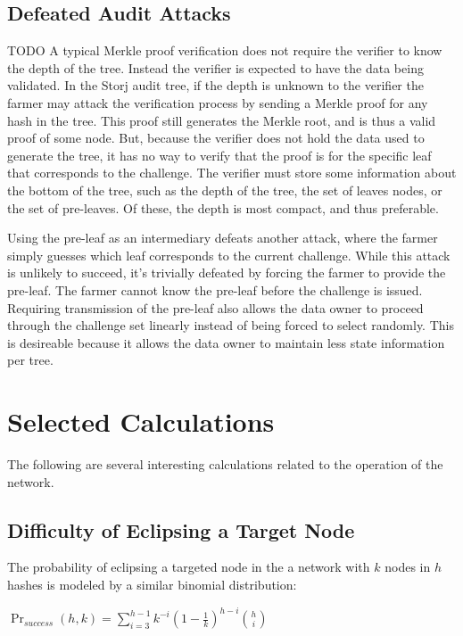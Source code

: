 \documentclass[a4paper,10pt]{article} \usepackage[utf8]{inputenc}
\newcommand{\todo}[1]{{\color{red} TODO #1 }}
\begin{document}
\subsection{Defeated Audit Attacks}

\todo{ A typical Merkle proof verification does not require the verifier to know
the depth of the tree. Instead the verifier is expected to have the data being
validated. In the Storj audit tree, if the depth is unknown to the verifier the
farmer may attack the verification process by sending a Merkle proof for any
hash in the tree. This proof still generates the Merkle root, and is thus a
valid proof of some node. But, because the verifier does not hold the data used
to generate the tree, it has no way to verify that the proof is for the specific
leaf that corresponds to the challenge. The verifier must store some information
about the bottom of the tree, such as the depth of the tree, the set of leaves
nodes, or the set of pre-leaves. Of these, the depth is most compact, and thus
preferable.

Using the pre-leaf as an intermediary defeats another attack, where the farmer
simply guesses which leaf corresponds to the current challenge. While this
attack is unlikely to succeed, it's trivially defeated by forcing the farmer to
provide the pre-leaf. The farmer cannot know the pre-leaf before the challenge
is issued. Requiring transmission of the pre-leaf also allows the data owner to
proceed through the challenge set linearly instead of being forced to select
randomly. This is desireable because it allows the data owner to maintain less
state information per tree. }

\section{Selected Calculations}

The following are several interesting calculations related to the operation of
the network.

\subsection{Difficulty of Eclipsing a Target Node}

The probability of eclipsing a targeted node in the a network with $ k $ nodes
in $ h $ hashes is modeled by a similar binomial distribution:

{\centering $\Pr_{success}(h, k) = \displaystyle \sum_{i=3}^{h-1}
k^{-i}(1-\frac{1}{k})^{h-i}{h \choose i}$ \\}
\end{document}
